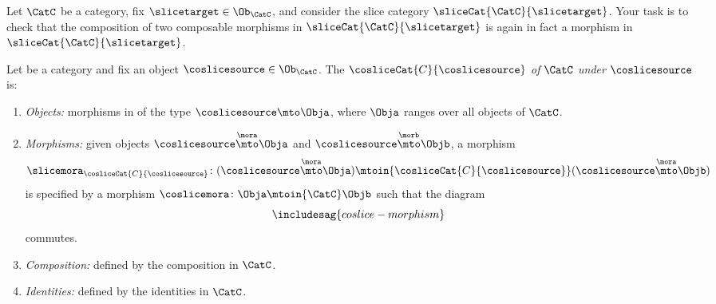 \begin{gradedexercise} 
    \label{ex:SliceCat}

    Let $\CatC$ be a category, fix $\slicetarget \in \Ob_{\CatC}$, and consider the slice category $\sliceCat{\CatC}{\slicetarget}$. Your task is to check that the composition of two composable morphisms in $\sliceCat{\CatC}{\slicetarget}$ is again in fact a morphism in $\sliceCat{\CatC}{\slicetarget}$. 
\end{gradedexercise}



\begin{ctdefinition}
    \label{def:coslice-category}

    Let \CatC be a category and fix an object $\coslicesource \in \Ob_\CatC$.
    The  $\cosliceCat{C}{\coslicesource}$ \emph{of} $\CatC$ \emph{under} $\coslicesource$ is:
    \begin{enumerate}
        \item \emph{Objects:} morphisms in \CatC of the type $\coslicesource \mto \Obja$, where $\Obja$ ranges over all objects of $\CatC$.
        \item \emph{Morphisms:} given objects $\coslicesource \overset{\mora}{\mto} \Obja$ and $\coslicesource  \overset{\morb}{\mto} \Objb$, a morphism
              \begin{equation}
                  \slicemora_{\cosliceCat{C}{\coslicesource}} \colon (\coslicesource \overset{\mora}{\mto} \Obja)
                  \mtoin{\cosliceCat{C}{\coslicesource}}
                  (\coslicesource \overset{\mora}{\mto} \Objb)
              \end{equation}
              is specified by a morphism $\coslicemora \colon \Obja \mtoin{\CatC} \Objb$ such that the diagram
              \begin{equation}\label{eq:coslice-morphism}
                  \includesag{coslice-morphism}
              \end{equation}
              commutes.

        \item \emph{Composition:} defined by the composition in $\CatC$.
        \item \emph{Identities:} defined by the identities in $\CatC$.
    \end{enumerate}
\end{ctdefinition}

